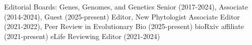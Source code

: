 \documentclass[letterpaper,10pt]{article}
\renewenvironment{itemize}{
  \begin{list}{}{
    \setlength{\leftmargin}{1.5em}
  }
}{
  \end{list}
}
\begin{document}
\begin{itemize}
\item Editorial Boards:
Genes, Genomes, and Genetics Senior (2017-2024), Associate (2014-2024), Guest (2025-present) Editor, %
New Phytologist Associate Editor (2021-2022),  %
Peer Review in Evolutionary Bio (2025-present)
bioRxiv affiliate (2021-present)
eLife Reviewing Editor (2021-2024)

\end{itemize}
\end{document}
